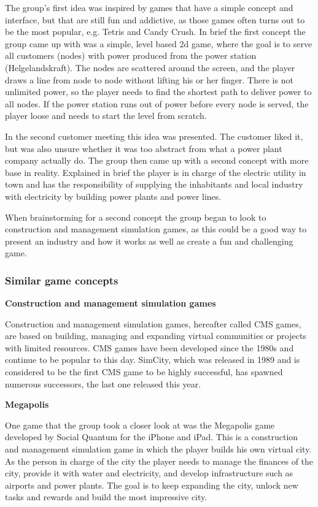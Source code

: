 The group's first idea was inspired by games that have a simple concept and
interface, but that are still fun and addictive, as those games often turns out
to be the most popular, e.g. Tetris and Candy Crush. In brief the first concept
the group came up with was a simple, level based 2d game, where the goal is
to serve all customers (nodes) with power produced from the power station
(Helgelandskraft). The nodes are scattered around the screen, and the player
draws a line from node to node without lifting his or her finger. There is
not unlimited power, so the player needs to find the shortest path to deliver
power to all nodes. If the power station runs out of power before every node is
served, the player loose and needs to start the level from scratch.

In the second customer meeting this idea was presented. The customer liked it,
but was also unsure whether it was too abstract from what a power plant company
actually do. The group then came up with a second concept with more base in
reality. Explained in brief the player is in charge of the electric utility in
town and has the responsibility of supplying the inhabitants and local industry
with electricity by building power plants and power lines.

When brainstorming for a second concept the group began to look to construction
and management simulation games, as this could be a good way to present an
industry and how it works as well as create a fun and challenging game. 

\subsubsection{Similar game concepts}

{\bf Construction and management simulation games}

Construction and management simulation games, hereafter called CMS games, are
based on building, managing and expanding virtual communities or projects
with limited resources. CMS games have been developed since the 1980s and
continue to be popular to this day. SimCity, which was released in 1989 and
is considered to be the first CMS game to be highly successful, has spawned
numerous successors, the last one released this year.

{\bf Megapolis}

One game that the group took a closer look at was the Megapolis game developed
by Social Quantum for the iPhone and iPad. This is a construction and
management simulation game in which the player builds his own virtual city. As
the person in charge of the city the player needs to manage the finances of the
city, provide it with water and electricity, and develop infrastructure such as
airports and power plants. The goal is to keep expanding the city, unlock new
tasks and rewards and build the most impressive city.

